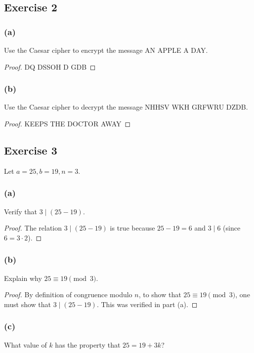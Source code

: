 \documentclass[14pt]{extarticle}
\begin{document}
\subsection{Exercise 2}
\subsubsection{(a)}
Use the Caesar cipher to encrypt the message AN APPLE A DAY.

\begin{proof}
DQ DSSOH D GDB
\end{proof}

\subsubsection{(b)}
Use the Caesar cipher to decrypt the message NHHSV WKH GRFWRU DZDB.

\begin{proof}
KEEPS THE DOCTOR AWAY
\end{proof}

\subsection{Exercise 3}
Let \(a = 25, b = 19, n = 3\).

\subsubsection{(a)}
Verify that \(3 \mid (25 - 19)\).

\begin{proof}
The relation \(3 \mid (25 - 19)\) is true because \(25 - 19 = 6\) and \(3 \mid 6\) (since \(6 = 3 \cdot 2\)).
\end{proof}

\subsubsection{(b)}
Explain why \(25 \equiv 19 \pmod 3\).

\begin{proof}
By definition of congruence modulo \(n\), to show that \(25 \equiv 19 \pmod 3\), one must show that \(3 \mid (25-19)\). 
This was verified in part (a).
\end{proof}

\subsubsection{(c)}
What value of \(k\) has the property that \(25 = 19 + 3k\)?
\end{document}
